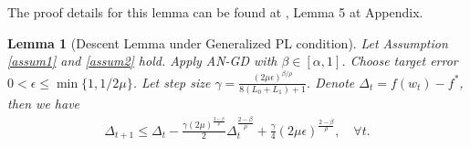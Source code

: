 \documentclass[10pt]{article} %
\newtheorem{lemma}{Lemma}
\begin{document}
The proof details for this lemma can be found at \citet{pmlr-v202-chen23ar}, Lemma 5 at Appendix.

\begin{lemma}[Descent Lemma under Generalized PL condition]
Let Assumption \ref{assum1} and \ref{assum2} hold. Apply AN-GD with $\beta\in [\alpha,1]$. Choose target error $0 < \epsilon \leq \min\{1, 1/2\mu\}$.
Let step size $\gamma = \frac{(2\mu\epsilon)^{\beta/\rho}}{8(L_0+L_1)+1}$.
Denote $\Delta_t = f(w_t)-f^*$, then we have 
\begin{align}
  \Delta_{t+1} \leq \Delta_t - \frac{\gamma (2\mu)^{\frac{2-\beta}{\rho}}}{2} \Delta_t^{\frac{2-\beta}{\rho}}+\frac{\gamma}{4}(2\mu\epsilon)^{\frac{2-\beta}{\rho}}, \quad \forall t.
\end{align}
\end{lemma}
\end{document}
